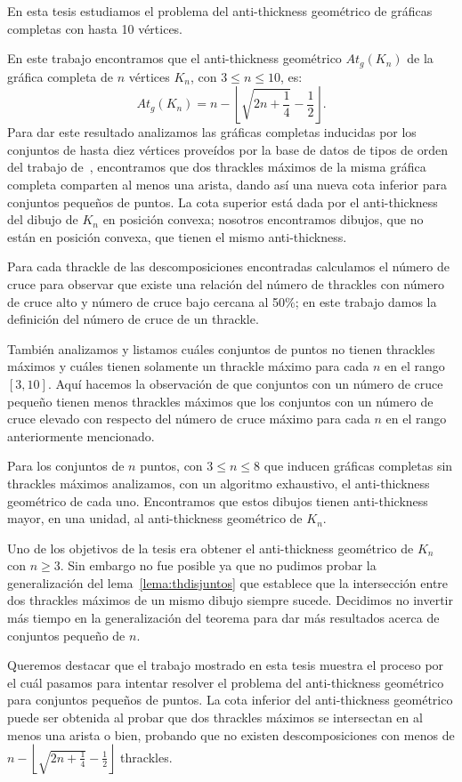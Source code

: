 En esta tesis estudiamos el problema del anti-thickness geométrico de gráficas completas con hasta 10 vértices.

En este trabajo encontramos que el anti-thickness geométrico $At_g(K_n)$ de la gráfica completa de $n$ vértices $K_n$, con $ 3 \leq n \leq 10$, es:
\[ At_g(K_n) =  n - \left\lfloor \sqrt{2n + \frac{1}{4}} - \frac{1}{2}\right\rfloor. \]
Para dar este resultado analizamos las gráficas completas inducidas por los conjuntos de hasta diez
vértices proveídos por la base de datos de tipos de orden del trabajo de~\cite{Aichholzer2001}, encontramos que dos thrackles máximos de la misma gráfica completa comparten al menos una arista, dando así una nueva cota inferior para conjuntos pequeños de puntos. La cota superior está dada por el anti-thickness del dibujo de $K_n$ en posición convexa; nosotros encontramos dibujos, que no están en posición convexa, que tienen el mismo anti-thickness.

Para cada thrackle de las descomposiciones encontradas calculamos el número
de cruce para observar que existe una relación del número de thrackles con número de cruce alto y número de
cruce bajo cercana al 50\%; en este trabajo damos la definición del número de cruce de un thrackle.

También analizamos y listamos cuáles conjuntos de puntos no tienen thrackles máximos y cuáles tienen
solamente un thrackle máximo para cada $n$ en el rango $[3,10]$. Aquí hacemos la observación de que
conjuntos con un número de cruce pequeño tienen menos thrackles máximos que los conjuntos con un número de
cruce elevado con respecto del número de cruce máximo para cada $n$ en el rango anteriormente mencionado.

Para los conjuntos de $n$ puntos, con $3 \leq n \leq 8$ que inducen gráficas completas sin thrackles
máximos analizamos, con un algoritmo exhaustivo, el anti-thickness geométrico de cada uno. Encontramos que
estos dibujos tienen anti-thickness mayor, en una unidad, al anti-thickness geométrico de $K_n$.

Uno de los objetivos de la tesis era obtener el anti-thickness geométrico de $K_n$ con $n\geq 3$. Sin
embargo no fue posible ya que no pudimos probar la generalización del lema~\ref{lema:thdisjuntos} que
establece que la intersección entre dos thrackles máximos de un mismo dibujo siempre sucede. Decidimos no
invertir más tiempo en la generalización del teorema para dar más resultados acerca de conjuntos pequeño de
$n$.

Queremos destacar que el trabajo mostrado en esta tesis muestra el proceso por el cuál pasamos para
intentar resolver el problema del anti-thickness geométrico para conjuntos pequeños de puntos. La cota
inferior del anti-thickness geométrico puede ser obtenida al probar que dos thrackles máximos se
intersectan en al menos una arista o bien, probando que no existen descomposiciones con menos de $n -
\left\lfloor \sqrt{2n + \frac{1}{4}} - \frac{1}{2}\right\rfloor$ thrackles.


